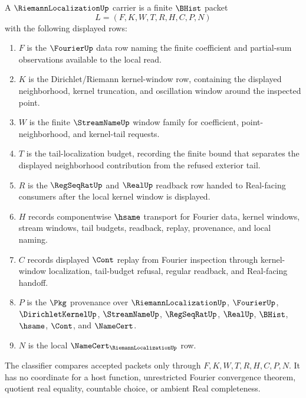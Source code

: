 \begin{definition}
\label{def:riemann-localization-carrier}
A $\RiemannLocalizationUp$ carrier is a finite $\BHist$ packet
$$
L=(F,K,W,T,R,H,C,P,N)
$$
with the following displayed rows:
\begin{enumerate}
\item $F$ is the $\FourierUp$ data row naming the finite coefficient and partial-sum observations available to the local read.
\item $K$ is the Dirichlet/Riemann kernel-window row, containing the displayed neighborhood, kernel truncation, and oscillation window around the inspected point.
\item $W$ is the finite $\StreamNameUp$ window family for coefficient, point-neighborhood, and kernel-tail requests.
\item $T$ is the tail-localization budget, recording the finite bound that separates the displayed neighborhood contribution from the refused exterior tail.
\item $R$ is the $\RegSeqRatUp$ and $\RealUp$ readback row handed to Real-facing consumers after the local kernel window is displayed.
\item $H$ records componentwise $\hsame$ transport for Fourier data, kernel windows, stream windows, tail budgets, readback, replay, provenance, and local naming.
\item $C$ records displayed $\Cont$ replay from Fourier inspection through kernel-window localization, tail-budget refusal, regular readback, and Real-facing handoff.
\item $P$ is the $\Pkg$ provenance over $\RiemannLocalizationUp$, $\FourierUp$, $\DirichletKernelUp$, $\StreamNameUp$, $\RegSeqRatUp$, $\RealUp$, $\BHist$, $\hsame$, $\Cont$, and $\NameCert$.
\item $N$ is the local $\NameCert_{\RiemannLocalizationUp}$ row.
\end{enumerate}
The classifier compares accepted packets only through $F,K,W,T,R,H,C,P,N$. It has no coordinate for a host function, unrestricted Fourier convergence theorem, quotient real equality, countable choice, or ambient Real completeness.
\end{definition}

